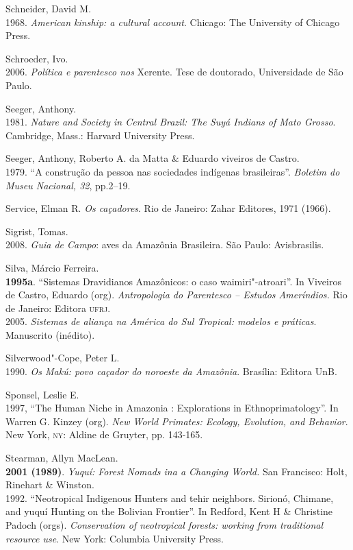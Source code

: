 \begin{bibliohedra}
Schneider, David M.\\
1968. \emph{American kinship: a cultural account}. Chicago: The
University of Chicago Press.

Schroeder, Ivo.\\
2006. \emph{Política e parentesco nos} Xerente. Tese de
doutorado, Universidade de São Paulo.

Seeger, Anthony.\\
1981. \emph{Nature and Society in Central Brazil: The Suyá
Indians of Mato Grosso}. Cambridge, Mass.: Harvard University Press.

Seeger, Anthony, Roberto A. da Matta \& Eduardo viveiros de Castro.\\
1979. ``A construção da pessoa nas sociedades indígenas
brasileiras''. \emph{Boletim do Museu Nacional, 32}, pp.2--19.

Service, Elman R. \emph{Os caçadores}. Rio de Janeiro: Zahar Editores,
1971 (1966).

Sigrist, Tomas.\\
2008. \emph{Guia de Campo}: aves da Amazônia Brasileira. São
Paulo: Avisbrasilis.

Silva, Márcio Ferreira.\\
\textbf{1995a}. ``Sistemas Dravidianos Amazônicos: o caso
waimiri"-atroari''. In Viveiros de Castro, Eduardo (org).
\emph{Antropologia do Parentesco -- Estudos Ameríndios.} Rio de Janeiro:
Editora \textsc{ufrj}.\\
2005. \emph{Sistemas de aliança na América do Sul Tropical:
modelos e práticas}. Manuscrito (inédito).

Silverwood"-Cope, Peter L.\\
1990. \emph{Os Makú: povo caçador do noroeste da Amazônia}.
Brasília: Editora UnB.

Sponsel, Leslie E.\\
1997, ``The Human Niche in Amazonia : Explorations in
Ethnoprimatology''. In Warren G. Kinzey (org). \emph{New World Primates:
Ecology, Evolution, and Behavior}. New York, \textsc{ny}: Aldine de Gruyter, pp.
143-165.

Stearman, Allyn MacLean.\\
\textbf{2001 (1989)}. \emph{Yuquí: Forest Nomads ina a Changing World.}
San Francisco: Holt, Rinehart \& Winston.\\
1992. ``Neotropical Indigenous Hunters and tehir neighbors.
Sirionó, Chimane, and yuquí Hunting on the Bolivian Frontier''. In
Redford, Kent H \& Christine Padoch (orgs). \emph{Conservation of
neotropical forests: working from traditional resource use}. New York:
Columbia University Press.


\end{bibliohedra}
